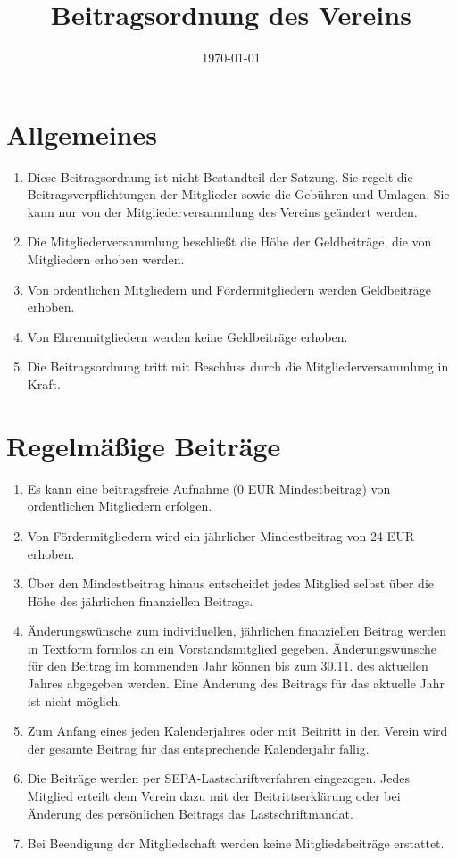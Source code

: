 \documentclass[12pt,a4paper,draft]{article}
\title{Beitragsordnung des Vereins \unsername}
\author{\unsername}
\date{\today}
\begin{document}
\maketitle
\tableofcontents

\section{Allgemeines}
\begin{enumerate}
\item Diese Beitragsordnung ist nicht Bestandteil der Satzung. Sie regelt die 
Beitragsverpflichtungen der Mitglieder sowie die Gebühren und Umlagen. Sie kann 
nur von der Mitgliederversammlung des Vereins geändert werden.

\item Die Mitgliederversammlung beschließt die Höhe der Geldbeiträge, die von 
Mitgliedern erhoben werden.

\item Von ordentlichen Mitgliedern und Fördermitgliedern werden Geldbeiträge 
erhoben.

\item Von Ehrenmitgliedern werden keine Geldbeiträge erhoben.

\item Die Beitragsordnung tritt mit Beschluss durch die Mitgliederversammlung in Kraft.
\end{enumerate}

\section{Regelmäßige Beiträge}
\begin{enumerate}
\item Es kann eine beitragsfreie Aufnahme (0 EUR Mindestbeitrag) von ordentlichen Mitgliedern erfolgen.

\item Von Fördermitgliedern wird ein jährlicher Mindestbeitrag von 24 EUR erhoben.

\item Über den Mindestbeitrag hinaus entscheidet jedes Mitglied selbst über die Höhe des jährlichen
finanziellen Beitrags.

\item Änderungswünsche zum individuellen, jährlichen finanziellen Beitrag werden in Textform formlos an
ein Vorstandsmitglied gegeben. Änderungswünsche für den Beitrag im kommenden Jahr können bis zum 30.11.
des aktuellen Jahres abgegeben werden. Eine Änderung des Beitrags für das aktuelle Jahr ist nicht möglich.

\item Zum Anfang eines jeden Kalenderjahres oder mit Beitritt in den Verein wird der gesamte Beitrag für
das entsprechende Kalenderjahr fällig.

\item Die Beiträge werden per SEPA-Lastschriftverfahren eingezogen. Jedes Mitglied erteilt dem Verein
dazu mit der Beitrittserklärung oder bei Änderung des persönlichen Beitrags das Lastschriftmandat.

\item Bei Beendigung der Mitgliedschaft werden keine Mitgliedsbeiträge 
erstattet.
\end{enumerate}
\end{document}
